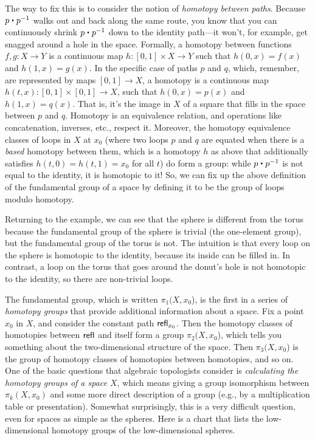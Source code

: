 The way to fix this is to consider the notion of \emph{homotopy between
paths}. Because $p \ct \opp p$ walks out and back along the same route, you know
that you can continuously shrink $p \ct \opp p$ down to the identity path---it
won't, for example, get snagged around a hole in the space.  Formally, a
homotopy between functions $f, g : X \rightarrow Y$ is a continuous map 
$h : [0,1] \times X \rightarrow Y$ such that $h(0,x) = f(x)$ and $h(1,x) = g(x)$.  In the specific case
of paths $p$ and $q$, which, remember, are represented by maps $[0,1] \rightarrow X$, a
homotopy is a continuous map $h(t,x) : [0,1] \times [0,1] \rightarrow X$, such that
$h(0,x) = p(x)$ and $h(1,x) = q(x)$.  That is, it's the image in $X$ of a
square that fills in the space between $p$ and $q$.  Homotopy is an
equivalence relation, and operations like concatenation, inverses,
etc., respect it.  Moreover, the homotopy equivalence classes of loops in
$X$ at $x_0$ (where two loops $p$ and $q$ are equated when there is a \emph{based}
homotopy between them, which is a homotopy $h$ as above that additionally
satisfies $h(t,0) = h(t,1) = x_0$ for all $t$) do form a group: while $p \ct \opp p$
is not equal to the identity, it is homotopic to it!  So, we can fix up
the above definition of the fundamental group of a space by defining it
to be the group of loops modulo homotopy.

Returning to the example, we can see that the sphere is different from
the torus because the fundamental group of the sphere is trivial (the
one-element group), but the fundamental group of the torus is not.  The
intuition is that every loop on the sphere is homotopic to the identity,
because its inside can be filled in.  In contrast, a loop on the torus that
goes around the donut's hole is not homotopic to the identity, so there
are non-trivial loops.

The fundamental group, which is written $\pi_1(X,x_0$), is the first in
a series of \emph{homotopy groups} that provide additional information
about a space.  Fix a point $x_0$ in $X$, and consider the constant path
$\mathsf{refl}_{x_0}$.  Then the homotopy classes of homotopies between $\mathsf{refl}_{}$ and itself form a
group $\pi_2(X,x_0$), which tells you
something about the two-dimensional structure of the space.  Then
$\pi_3(X,x_0$) is the group of homotopy classes of homotopies between homotopies, and so on.
One of the basic questions that algebraic topologists consider is
\emph{calculating the homotopy groups of a space $X$}, which means
giving a group isomorphism between $\pi_k(X,x_0)$ and some more direct
description of a group (e.g., by a multiplication table or
presentation).  Somewhat surprisingly, this is a very difficult
question, even for spaces as simple as the spheres.  Here is a chart
that lists the low-dimensional homotopy groups of the low-dimensional
spheres.


